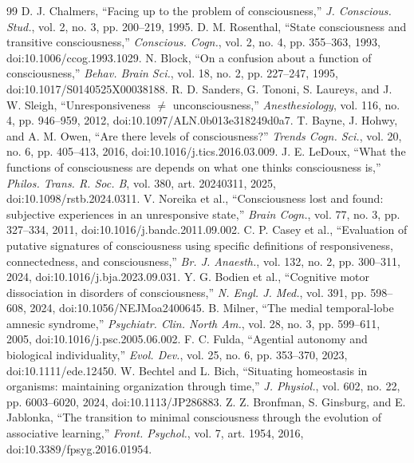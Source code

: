 \balance
\begin{thebibliography}{99}\small
{} D. J. Chalmers, ``Facing up to the problem of consciousness,'' \emph{J. Conscious. Stud.}, vol. 2, no. 3, pp. 200--219, 1995.
 D. M. Rosenthal, ``State consciousness and transitive consciousness,'' \emph{Conscious. Cogn.}, vol. 2, no. 4, pp. 355--363, 1993, doi:10.1006/ccog.1993.1029.
 N. Block, ``On a confusion about a function of consciousness,'' \emph{Behav. Brain Sci.}, vol. 18, no. 2, pp. 227--247, 1995, doi:10.1017/S0140525X00038188.
 R. D. Sanders, G. Tononi, S. Laureys, and J. W. Sleigh, ``Unresponsiveness $\neq$ unconsciousness,'' \emph{Anesthesiology}, vol. 116, no. 4, pp. 946--959, 2012, doi:10.1097/ALN.0b013e318249d0a7.
 T. Bayne, J. Hohwy, and A. M. Owen, ``Are there levels of consciousness?'' \emph{Trends Cogn. Sci.}, vol. 20, no. 6, pp. 405--413, 2016, doi:10.1016/j.tics.2016.03.009.
 J. E. LeDoux, ``What the functions of consciousness are depends on what one thinks consciousness is,'' \emph{Philos. Trans. R. Soc. B}, vol. 380, art. 20240311, 2025, doi:10.1098/rstb.2024.0311.
 V. Noreika et al., ``Consciousness lost and found: subjective experiences in an unresponsive state,'' \emph{Brain Cogn.}, vol. 77, no. 3, pp. 327--334, 2011, doi:10.1016/j.bandc.2011.09.002.
 C. P. Casey et al., ``Evaluation of putative signatures of consciousness using specific definitions of responsiveness, connectedness, and consciousness,'' \emph{Br. J. Anaesth.}, vol. 132, no. 2, pp. 300--311, 2024, doi:10.1016/j.bja.2023.09.031.
 Y. G. Bodien et al., ``Cognitive motor dissociation in disorders of consciousness,'' \emph{N. Engl. J. Med.}, vol. 391, pp. 598--608, 2024, doi:10.1056/NEJMoa2400645.
 B. Milner, ``The medial temporal-lobe amnesic syndrome,'' \emph{Psychiatr. Clin. North Am.}, vol. 28, no. 3, pp. 599--611, 2005, doi:10.1016/j.psc.2005.06.002.
 F. C. Fulda, ``Agential autonomy and biological individuality,'' \emph{Evol. Dev.}, vol. 25, no. 6, pp. 353--370, 2023, doi:10.1111/ede.12450.
 W. Bechtel and L. Bich, ``Situating homeostasis in organisms: maintaining organization through time,'' \emph{J. Physiol.}, vol. 602, no. 22, pp. 6003--6020, 2024, doi:10.1113/JP286883.
 Z. Z. Bronfman, S. Ginsburg, and E. Jablonka, ``The transition to minimal consciousness through the evolution of associative learning,'' \emph{Front. Psychol.}, vol. 7, art. 1954, 2016, doi:10.3389/fpsyg.2016.01954.

\end{thebibliography}
